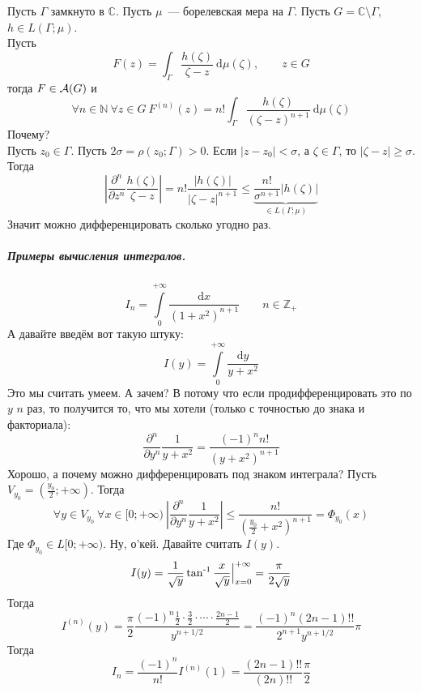 \documentclass{article}
\begin{document}
    \begin{example}
        Пусть $\Gamma$ замкнуто в $\mathbb C$. Пусть $\mu$~--- борелевская мера на $\Gamma$. Пусть $G=\mathbb C\setminus\Gamma$, $h\in L(\Gamma;\mu)$.\\
        Пусть
        $$
        F(z)=\int_\Gamma\frac{h(\zeta)}{\zeta-z}~\mathrm d\mu(\zeta),\qquad z\in G
        $$
        тогда $F\in{\mathcal{A}}(G)$ и
        $$
        \forall n\in\mathbb N~\forall z\in G~F^{(n)}(z)=n!\int_\Gamma\frac{h(\zeta)}{(\zeta-z)^{n+1}}~\mathrm d\mu(\zeta)
        $$
        Почему?\\
        Пусть $z_0\in\Gamma$. Пусть $2\sigma=\rho(z_0;\Gamma)>0$. Если $|z-z_0|<\sigma$, а $\zeta\in\Gamma$, то $|\zeta-z|\geqslant\sigma$. Тогда
        $$
        \left|\frac{\partial^n}{\partial z^n}\frac{h(\zeta)}{\zeta-z}\right|=n!\frac{|h(\zeta)|}{|\zeta-z|^{n+1}}\leqslant\underbrace{\frac{n!}{\sigma^{n+1}}|h(\zeta)|}_{\in L(\Gamma;\mu)}
        $$
        Значит можно дифференцировать сколько угодно раз.
    \end{example}
    \subparagraph{Примеры вычисления интегралов.}
    \begin{example}
        $$
        I_n=\int\limits_0^{+\infty}\frac{\mathrm dx}{(1+x^2)^{n+1}}\qquad n\in\mathbb Z_+
        $$
        А давайте введём вот такую штуку:
        $$
        I(y)=\int\limits_0^{+\infty}\frac{\mathrm dy}{y+x^2}
        $$
        Это мы считать умеем. А зачем? В потому что если продифференцировать это по $y$ $n$ раз, то получится то, что мы хотели (только с точностью до знака и факториала):
        $$
        \frac{\partial^n}{\partial y^n}\frac1{y+x^2}=\frac{(-1)^nn!}{(y+x^2)^{n+1}}
        $$
        Хорошо, а почему можно дифференцировать под знаком интеграла? Пусть $V_{y_0}=\left(\frac{y_0}2;+\infty\right)$. Тогда
        $$
        \forall y\in V_{y_0}~\forall x\in[0;+\infty)~\left|\frac{\partial^n}{\partial y^n}\frac1{y+x^2}\right|\leqslant\frac{n!}{\left(\frac{y_0}2+x^2\right)^{n+1}}=\Phi_{y_0}(x)
        $$
        Где $\Phi_{y_0}\in L[0;+\infty)$. Ну, о'кей. Давайте считать $I(y)$.
        $$
        I(y)=\frac1{\sqrt y}\operatorname{\tan^{-1}}\frac x{\sqrt y}\Big|_{x=0}^{+\infty}=\frac\pi{2\sqrt y}
        $$
        Тогда
        $$
        I^{(n)}(y)=\frac\pi2\frac{(-1)^n\frac12\cdot\frac32\cdot\cdots\cdot\frac{2n-1}2}{y^{n+1/2}}=\frac{(-1)^n(2n-1)!!}{2^{n+1}y^{n+1/2}}\pi
        $$
        Тогда
        $$
        I_n=\frac{(-1)^n}{n!}I^{(n)}(1)=\frac{(2n-1)!!}{(2n)!!}\frac\pi2
        $$
    \end{example}
\end{document}

